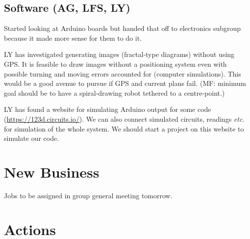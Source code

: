 \documentclass[a4paper,11pt,twoside,class=meetingmins,crop=false]{standalone}
\begin{document}
\begin{items}
\subsection{Software (AG, LFS, LY)}
    \item Started looking at Arduino boards but handed that off to electronics subgroup because it made more sense for them to do it.
    \item LY has investigated generating images (fractal-type diagrams) without using GPS. It is feasible to draw images without a positioning system even with possible turning and moving errors accounted for (computer simulations). This would be a good avenue to pursue if GPS and current plans fail. (MF: minimum goal should be to have a spiral-drawing robot tethered to a centre-point.)
    \item LY has found a website for simulating Arduino output for some code (\url{https://123d.circuits.io/}). We can also connect simulated circuits, readings \emph{etc.} for simulation of the whole system. We should start a project on this website to simulate our code.
\end{items}


\section{New Business}
\begin{items}
\item Jobs to be assigned in group general meeting tomorrow.
\end{items}

\vspace{1em}
\vspace{1em}

\section{Actions}
\begin{items}
\end{items}
\end{document}

